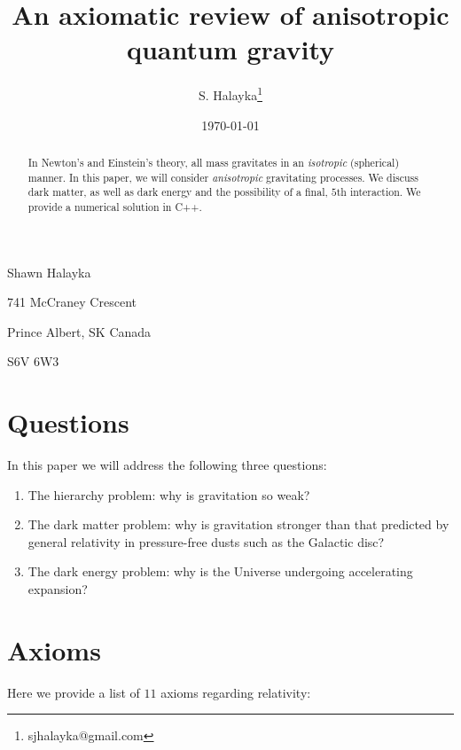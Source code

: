 \documentclass[12pt]{article}
\title{An axiomatic review of anisotropic quantum gravity}
\author{S. Halayka\footnote{sjhalayka@gmail.com}}
\date{\today\;\currenttime}
\begin{document}
 
\maketitle



Shawn Halayka

741 McCraney Crescent

Prince Albert, SK Canada

S6V 6W3



\begin{abstract}
In Newton's and Einstein's theory, all mass gravitates in an {\textit{isotropic}} (spherical) manner.
In this paper, we will consider {\textit{anisotropic}} gravitating processes.
We discuss dark matter, as well as dark energy and the possibility of a final, $5$th interaction.
We provide a numerical solution in C++.
\end{abstract}


\section{Questions}

In this paper we will address the following three questions:
\begin{enumerate}
\item The hierarchy problem: why is gravitation so weak?
\item The dark matter problem: why is gravitation stronger than that predicted by general relativity in pressure-free dusts such as the Galactic disc?
\item The dark energy problem: why is the Universe undergoing accelerating expansion?
\end{enumerate}






\section{Axioms}

Here we provide a list of $11$ axioms regarding relativity:
\end{document}
